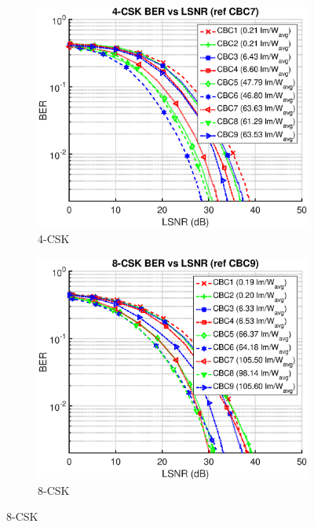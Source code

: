 \documentclass[10pt,letterpaper]{article}
\begin{document}
\begin{figure}[t]
	\centering
		\begin{subfigure}{0.32\textwidth}
		\centering
			\includegraphics[trim={0.1in 0.0in 0.5in 0.1in}, clip=true, width=\textwidth]{M04_4-CSK_BERvsLSNR_NL.eps}
			\caption{4-CSK}
			\label{fig4LSNR}
		\end{subfigure}
		\begin{subfigure}{0.32\textwidth}
		\centering
			\includegraphics[trim={0.1in 0.0in 0.5in 0.1in}, clip=true, width=\textwidth]{M08_8-CSK_BERvsLSNR_NL.eps}
			\caption{8-CSK}

\end{subfigure}
\end{figure}
\end{document}
